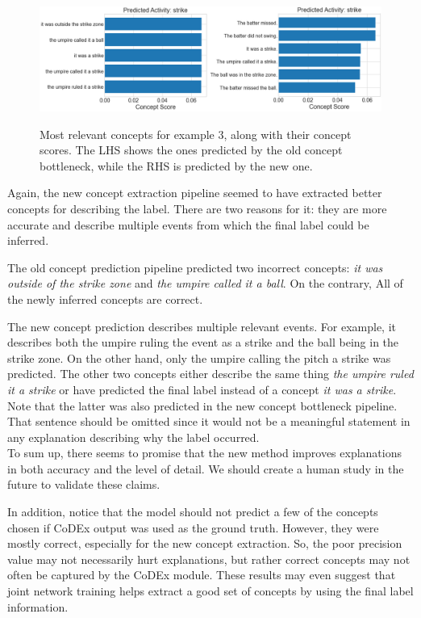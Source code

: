 \begin{figure}[h]
\caption{Most relevant concepts for example 3, along with their concept scores. The LHS shows the ones predicted by the old concept bottleneck, while the RHS is predicted by the new one.}
\centering
\includegraphics[width=\textwidth]{concept-bottleneck-pipeline/explanations_concepts3.png}
\label{concept-results-3}
\end{figure}

Again, the new concept extraction pipeline seemed to have extracted better concepts for describing the label.
There are two reasons for it: they are more accurate and describe multiple events from which the final label could be inferred.

The old concept prediction pipeline predicted two incorrect concepts: \emph{it was outside of the strike zone} and \emph{the umpire called it a ball}.
On the contrary, All of the newly inferred concepts are correct.

The new concept prediction describes multiple relevant events. 
For example, it describes both the umpire ruling the event as a strike and the ball being in the strike zone.
On the other hand, only the umpire calling the pitch a strike was predicted. 
The other two concepts either describe the same thing \emph{the umpire ruled it a strike} or have predicted the final label instead of a concept \emph{it was a strike}.
Note that the latter was also predicted in the new concept bottleneck pipeline. 
That sentence should be omitted since it would not be a meaningful statement in any explanation describing why the label occurred. \\

To sum up, there seems to promise that the new method improves explanations in both accuracy and the level of detail.
We should create a human study in the future to validate these claims.

In addition, notice that the model should not predict a few of the concepts chosen if CoDEx output was used as the ground truth.
However, they were mostly correct, especially for the new concept extraction.
So, the poor precision value may not necessarily hurt explanations, but rather correct concepts may not often be captured by the CoDEx module.
These results may even suggest that joint network training helps extract a good set of concepts by using the final label information. 


